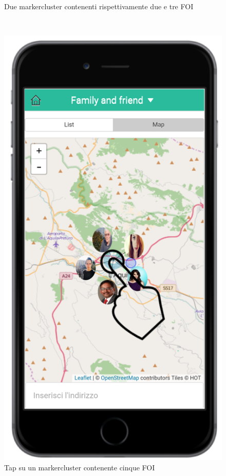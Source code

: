 \begin{figure}
\begin{minipage}[b]{6cm}
	\caption{Due markercluster contenenti rispettivamente due e tre FOI }
	\label{fig:markercluster}
 \end{minipage}
 \ \hspace{6 mm} \hspace{7 mm} \
 \begin{minipage}[b]{6cm}
\centering
\includegraphics[scale=0.9]{interfaccia/markerfoi.png}
	\caption{Tap su un markercluster contenente cinque FOI }
	\label{fig:markerfoi}
 \end{minipage}
\end{figure}

